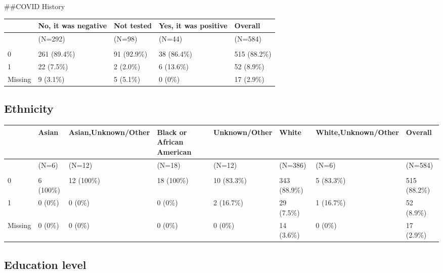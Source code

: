 \documentclass[
]{article}
\begin{document}
\#\#COVID History

\begin{tabular}[t]{lllll}
\toprule
  & No, it was negative & Not tested & Yes, it was positive & Overall\\
\midrule
 & (N=292) & (N=98) & (N=44) & (N=584)\\
\addlinespace[0.3em]
\multicolumn{5}{l}{\textbf{piab\_pos}}\\
\hspace{1em}0 & 261 (89.4\%) & 91 (92.9\%) & 38 (86.4\%) & 515 (88.2\%)\\
\hspace{1em}1 & 22 (7.5\%) & 2 (2.0\%) & 6 (13.6\%) & 52 (8.9\%)\\
\hspace{1em}Missing & 9 (3.1\%) & 5 (5.1\%) & 0 (0\%) & 17 (2.9\%)\\
\bottomrule
\end{tabular}

\hypertarget{ethnicity}{%
\subsection{Ethnicity}\label{ethnicity}}

\begin{tabular}[t]{llllllll}
\toprule
  & Asian & Asian,Unknown/Other & Black or African American & Unknown/Other & White & White,Unknown/Other & Overall\\
\midrule
 & (N=6) & (N=12) & (N=18) & (N=12) & (N=386) & (N=6) & (N=584)\\
\addlinespace[0.3em]
\multicolumn{8}{l}{\textbf{piab\_pos}}\\
\hspace{1em}0 & 6 (100\%) & 12 (100\%) & 18 (100\%) & 10 (83.3\%) & 343 (88.9\%) & 5 (83.3\%) & 515 (88.2\%)\\
\hspace{1em}1 & 0 (0\%) & 0 (0\%) & 0 (0\%) & 2 (16.7\%) & 29 (7.5\%) & 1 (16.7\%) & 52 (8.9\%)\\
\hspace{1em}Missing & 0 (0\%) & 0 (0\%) & 0 (0\%) & 0 (0\%) & 14 (3.6\%) & 0 (0\%) & 17 (2.9\%)\\
\bottomrule
\end{tabular}

\hypertarget{education-level}{%
\subsection{Education level}\label{education-level}}
\end{document}
